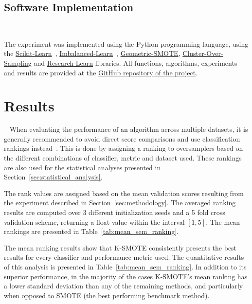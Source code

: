 \documentclass[remotesensing,article,submit,moreauthors,pdftex]{Definitions/mdpi}
\begin{document}
\begin{paracol}{2}
\linenumbers
\switchcolumn

\subsection{Software Implementation}~\label{sec:implementation}

The experiment was implemented using the Python programming language, using the
\href{https://scikit-learn.org/stable/}{Scikit-Learn}~\cite{Pedregosa2011},
\href{https://imbalanced-learn.org/en/stable/}{Imbalanced-Learn}~\cite{JMLR:v18:16-365},
\href{https://geometric-smote.readthedocs.io/en/latest/?badge=latest}{Geometric-SMOTE},
\href{https://cluster-over-sampling.readthedocs.io/en/latest/?badge=latest}{Cluster-Over-Sampling}
and \href{https://research-learn.readthedocs.io/en/latest/?badge=latest}{Research-Learn} libraries.
All functions, algorithms, experiments and results are provided at the
\href{https://github.com/AlgoWit/publications}{GitHub
repository of the project}.

\section{Results}~\label{sec:results}
When evaluating the performance of an algorithm across multiple datasets, it is
generally recommended to avoid direct score comparisons and use classification
rankings instead~\cite{demvsar2006}. This is done by assigning a ranking to
oversamplers based on the different combinations of classifier, metric and
dataset used. These rankings are also used for the statistical analyses
presented in Section~\ref{sec:statistical_analysis}.

The rank values are assigned based on the mean validation scores resulting from
the experiment described in Section~\ref{sec:methodology}. The averaged ranking
results are computed over 3 different initialization seeds and a 5 fold cross
validation scheme, returning a float value within the interval $[1,5]$. The mean
rankings are presented in Table~\ref{tab:mean_sem_ranking}.

The mean ranking results show that K-SMOTE consistently presents the best
results for every classifier and performance metric used. The quantitative
results of this analysis is presented in Table~\ref{tab:mean_sem_ranking}. In
addition to its superior performance, in the majority of the cases K-SMOTE's
mean ranking has a lower standard deviation than any of the remaining methods,
and particularly when opposed to SMOTE (the best performing benchmark method).

\end{paracol}
\end{document}

